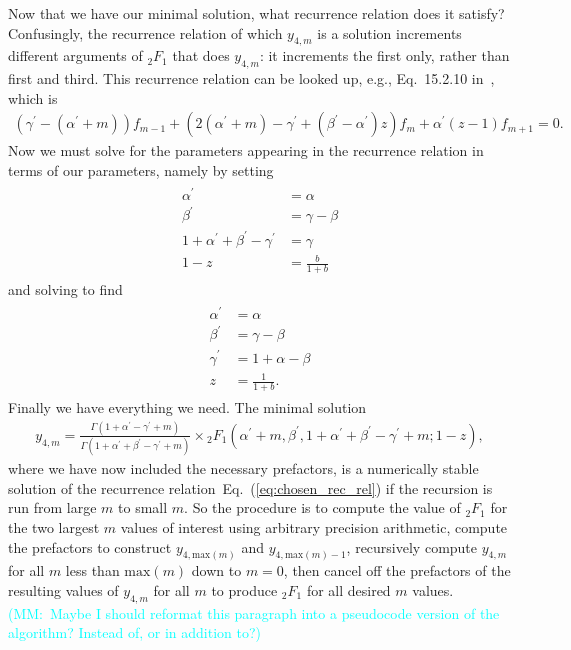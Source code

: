 \documentclass[12pt]{article}%
\newcommand{\mmnote}[1]{\textcolor{cyan}{(MM:~#1)}}
\newcommand{\eq}[1]{Eq.~(\ref{#1})}
\begin{document}
Now that we have our minimal solution,
what recurrence relation does it satisfy?
Confusingly, the recurrence relation of which $y_{4,m}$ is a solution
increments different arguments of ${_2F_1}$ that does $y_{4,m}$:
it increments the first only, rather than first and third.
This recurrence relation can be looked up, e.g., Eq.~15.2.10
in~\cite{Abramowitz1964}, which is
\begin{align}
(\gamma^\prime - (\alpha^\prime + m)) f_{m-1}
+
(2(\alpha^\prime+m) - \gamma^\prime + (\beta^\prime - \alpha^\prime)z)f_m
+ \alpha^\prime(z-1) f_{m+1} = 0.
\label{eq:chosen_rec_rel}
\end{align}
Now we must solve for the parameters appearing in the recurrence relation
in terms of our parameters, namely by setting
\begin{align}
\begin{split}
\alpha^\prime &= \alpha
\\
\beta^\prime &= \gamma - \beta
\\
1 + \alpha^\prime + \beta^\prime - \gamma^\prime &= \gamma
\\
1 - z &= \frac{b}{1+b}
\end{split}
\end{align}
and solving to find
\begin{align}
\begin{split}
\alpha^\prime &= \alpha
\\
\beta^\prime &= \gamma - \beta
\\
\gamma^\prime &= 1 + \alpha - \beta
\\
z &= \frac{1}{1+b}
.
\end{split}
\end{align}
Finally we have everything we need. The minimal solution
\begin{align}
y_{4,m}
=
\frac{\Gamma(1+\alpha^\prime-\gamma^\prime+m)}
        {\Gamma(1+\alpha^\prime+\beta^\prime-\gamma^\prime+m)}
\times
{_2F_1}\left(\alpha^\prime + m,
                \beta^\prime,
                1+\alpha^\prime+\beta^\prime-\gamma^\prime+m;
                1-z\right),
\end{align}
where we have now included the necessary prefactors,
is a numerically stable solution of the recurrence
relation~\eq{eq:chosen_rec_rel} if the recursion is run
from large $m$ to small $m$.
So the procedure is to compute the value of ${_2F_1}$ for the two
largest $m$ values of interest using arbitrary precision arithmetic,
compute the prefactors to construct
$y_{4,\text{max}(m)}$ and $y_{4,\text{max}(m)-1}$,
recursively compute $y_{4,m}$ for all $m$ less than $\text{max}(m)$ down
to $m=0$, then cancel off the prefactors of the resulting values of
$y_{4,m}$ for all $m$ to produce ${_2F_1}$ for all desired $m$ values.
\mmnote{Maybe I should reformat this paragraph into
a pseudocode version of the algorithm?
Instead of, or in addition to?}
\end{document}
